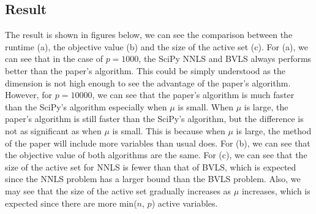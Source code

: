 \documentclass[11pt]{article}
\begin{document}
\subsection{Result}
The result is shown in figures below, we can see the comparison between the runtime (a),
the objective value (b) and the size of the active set (c). For (a), we can see that in the 
case of $p = 1000$, the SciPy NNLS and BVLS always performs better than the paper's algorithm.
This could be simply understood as the dimension is not high enough to see the advantage of the
paper's algorithm. However, for $p = 10000$, we can see that the paper's algorithm is much faster 
than the SciPy's algorithm especially when $\mu$ is small. When $\mu$ is large, the paper's
algorithm is still faster than the SciPy's algorithm, but the difference is not as significant
as when $\mu$ is small. This is because when $\mu$ is large, the method of the paper will include
more variables than usual does. For (b), we can see that the objective value of both algorithms are the
same. For (c), we can see that the size of the active set for NNLS is fewer than that of BVLS,
which is expected since the NNLS problem has a larger bound than the BVLS problem. Also, we may 
see that the size of the active set gradually increases as $\mu$ increases, which is expected
since there are more min($n$, $p$) active variables.
\end{document}
